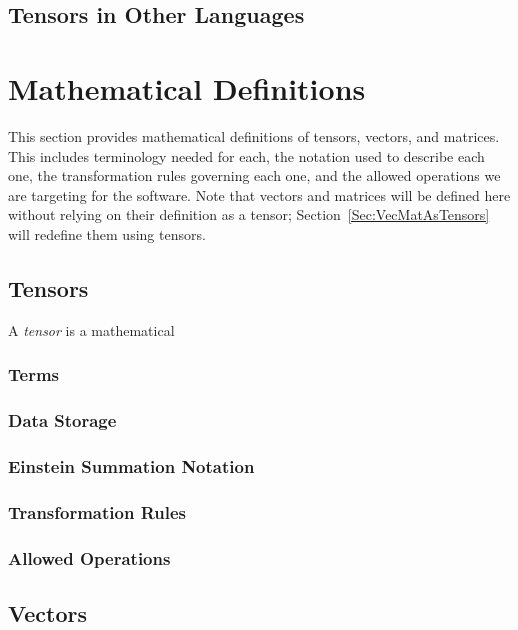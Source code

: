 \documentclass[12pt]{article}
\begin{document}
\subsection{Tensors in Other Languages}

\section{Mathematical Definitions}\label{Sec:MathematicalDefinitions}
This section provides mathematical definitions of tensors, vectors, and matrices.
This includes terminology needed for each, the notation used to describe each one,
the transformation rules governing each one, and the allowed operations we are 
targeting for the software. Note that vectors and matrices will be defined here without
relying on their definition as a tensor; Section~\ref{Sec:VecMatAsTensors} will redefine
them using tensors.

\subsection{Tensors}
A \textit{tensor} is a mathematical 

\subsubsection{Terms}

\subsubsection{Data Storage}

\subsubsection{Einstein Summation Notation}

\subsubsection{Transformation Rules}

\subsubsection{Allowed Operations}


\subsection{Vectors}
\end{document}
